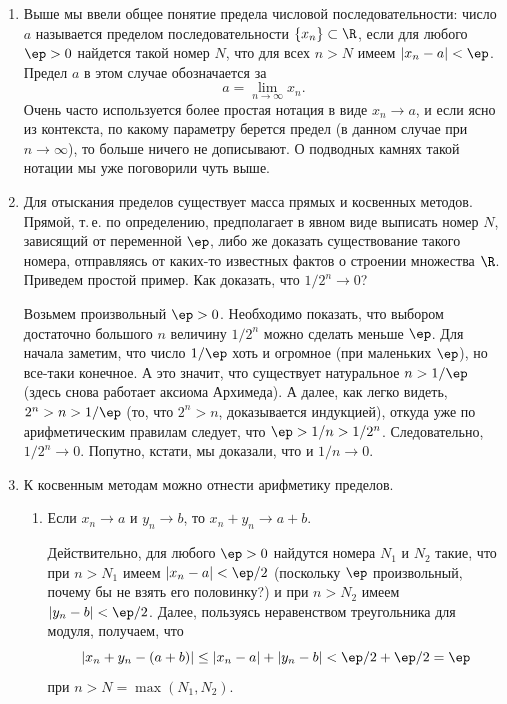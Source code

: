 

\begin{enumerate}
\item Выше мы ввели общее понятие предела числовой последовательности: число $a$ называется пределом последовательности $\{x_n\}\subset\R$, если для любого $\ep>0$ найдется такой номер $N$, что для всех $n>N$ имеем $|x_n-a|<\ep$. Предел $a$ в этом случае обозначается за
$$
a=\lim_{n\to\infty}x_n.
$$
Очень часто используется более простая нотация в виде $x_n\to a$, и если ясно из контекста, по какому параметру берется предел (в данном случае при $n\to\infty$), то больше ничего не дописывают. О подводных камнях такой нотации мы уже поговорили чуть выше.

\item Для отыскания пределов существует масса прямых и косвенных методов. Прямой, т.\,е. по определению, предполагает в явном виде выписать номер $N$, зависящий от переменной $\ep$, либо же доказать существование такого номера, отправляясь от каких-то известных фактов о строении множества $\R$. Приведем простой пример. Как доказать, что $1/2^n\to 0$?

Возьмем произвольный $\ep>0$. Необходимо показать, что выбором достаточно большого $n$ величину $1/2^n$ можно сделать меньше $\ep$. Для начала заметим, что число $1/\ep$ хоть и огромное (при маленьких $\ep$), но все-таки конечное. А это значит, что существует натуральное $n>1/\ep$ (здесь снова работает аксиома Архимеда). А далее, как легко видеть, $2^n>n>1/\ep$ (то, что $2^n>n$, доказывается индукцией), откуда уже по арифметическим правилам следует, что $\ep>1/n>1/2^n$. Следовательно, $1/2^n\to 0$. Попутно, кстати, мы доказали, что и $1/n\to 0$.

\item К косвенным методам можно отнести арифметику пределов.
\begin{enumerate}[\bf {Lim}1]
\item Если $x_n\to a$ и $y_n\to b$, то $x_n+y_n\to a+b$.

Действительно, для любого $\ep>0$ найдутся номера $N_1$ и $N_2$ такие, что при $n>N_1$ имеем $|x_n-a|<\ep/2$ (поскольку $\ep$ произвольный, почему бы не взять его половинку?) и при $n>N_2$ имеем $|y_n-b|<\ep/2$. Далее, пользуясь неравенством треугольника для модуля, получаем, что
$$
|x_n+y_n-(a+b)|\le|x_n-a|+|y_n-b|<\ep/2+\ep/2=\ep
$$
при $n>N=\max(N_1,N_2)$.


\end{enumerate}
\end{enumerate}
